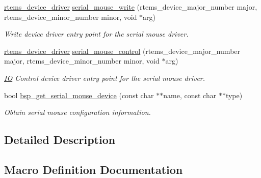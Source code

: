 \begin{DoxyCompactItemize}
\mbox{\hyperlink{group__ClassicStatus_ga545d41846817eaba6143d52ee4d9e9fe}{rtems\+\_\+device\+\_\+driver}} \mbox{\hyperlink{group__libmisc__serialmouse_ga28db6ac474fc2a38cd1ea76b297e508f}{serial\+\_\+mouse\+\_\+write}} (rtems\+\_\+device\+\_\+major\+\_\+number major, rtems\+\_\+device\+\_\+minor\+\_\+number minor, void $\ast$arg)
\begin{DoxyCompactList}\small\item\em Write device driver entry point for the serial mouse driver. \end{DoxyCompactList}\item 
\mbox{\hyperlink{group__ClassicStatus_ga545d41846817eaba6143d52ee4d9e9fe}{rtems\+\_\+device\+\_\+driver}} \mbox{\hyperlink{group__libmisc__serialmouse_ga67f047809baa7776b6510d65707c4ac5}{serial\+\_\+mouse\+\_\+control}} (rtems\+\_\+device\+\_\+major\+\_\+number major, rtems\+\_\+device\+\_\+minor\+\_\+number minor, void $\ast$arg)
\begin{DoxyCompactList}\small\item\em \mbox{\hyperlink{structIO}{IO}} Control device driver entry point for the serial mouse driver. \end{DoxyCompactList}\item 
bool \mbox{\hyperlink{group__libmisc__serialmouse_ga7103f15e10a857e48f4f026a58968288}{bsp\+\_\+get\+\_\+serial\+\_\+mouse\+\_\+device}} (const char $\ast$$\ast$name, const char $\ast$$\ast$type)
\begin{DoxyCompactList}\small\item\em Obtain serial mouse configuration information. \end{DoxyCompactList}\end{DoxyCompactItemize}


\subsection{Detailed Description}


\subsection{Macro Definition Documentation}
\mbox{\label{group__libmisc__serialmouse_ga8b4f360283d45558bb392ba1c78fd2fe}} 
